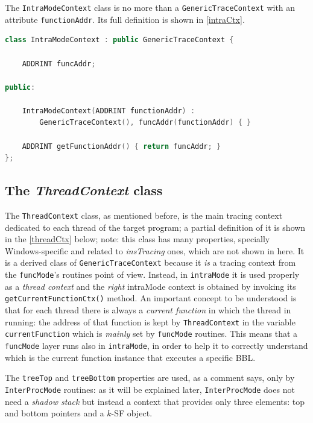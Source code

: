 \documentclass[a4paper,10pt]{report}
\begin{document}
The \verb|IntraModeContext| class is no more than a 
\verb|GenericTraceContext| with an attribute \verb|functionAddr|.
Its full definition is shown in \cref{intraCtx}.

\begin{lstlisting}[language=C++, 
	caption={definition of \texttt{IntraModeContext}}, 
	label=intraCtx, frame=leftline]
class IntraModeContext : public GenericTraceContext {

	ADDRINT funcAddr;

public:

	IntraModeContext(ADDRINT functionAddr) : 
		GenericTraceContext(), funcAddr(functionAddr) { }

	ADDRINT getFunctionAddr() { return funcAddr; }
};


\end{lstlisting}

\subsection{The \emph{ThreadContext} class}

The \verb|ThreadContext| class, as mentioned before, is the main 
tracing context dedicated to each thread of the target program; 
a partial definition of it is shown in the \cref{threadCtx} below;
note: this class has many properties, 
specially Windows-specific and related to \emph{insTracing} ones,
which are not shown in here. 
It is a derived class of \verb|GenericTraceContext| because it \emph{is} 
a tracing context from the \verb|funcMode|'s routines point of view.
Instead, in \verb|intraMode| it is used properly as a \emph{thread context} 
and the \emph{right} intraMode context is obtained by invoking its 
\verb|getCurrentFunctionCtx()| method.
An important concept to be understood is that for each thread there is
always a \emph{current function} in which the thread in running: 
the address of that function is kept by \verb|ThreadContext| in the
variable \verb|currentFunction| which is \emph{mainly} set by \verb|funcMode|
routines. This means that a \verb|funcMode| layer runs also in \verb|intraMode|,
in order to help it to correctly understand which is 
the current function instance that executes a specific BBL.

The \verb|treeTop| and \verb|treeBottom| properties are used, as a comment says,
only by \verb|InterProcMode| routines: as it will be explained later, 
\verb|InterProcMode| does not need a \emph{shadow stack} 
but instead a context that provides only three elements: 
top and bottom pointers and a $k$-SF object. 
\end{document}
